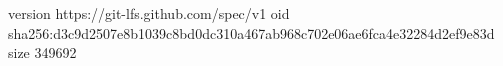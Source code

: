 version https://git-lfs.github.com/spec/v1
oid sha256:d3c9d2507e8b1039c8bd0dc310a467ab968c702e06ae6fca4e32284d2ef9e83d
size 349692
